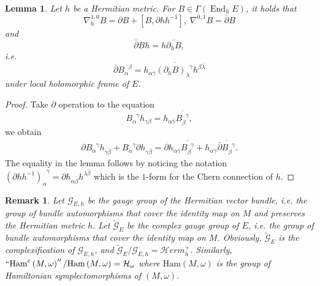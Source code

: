 \documentclass[10pt, letterpaper]{amsart}
\newcommand{\End}{\operatorname{End}}
\theoremstyle{plain}
\newtheorem{lemma}[theorem]{Lemma}
\newtheorem{remark}[theorem]{Remark}
\theoremstyle{definition}
\numberwithin{equation}{section}
\begin{document}
\begin{lemma}
\label{eqn:dB-dbarB}
    Let $h$ be a Hermitian metric. For $B\in \Gamma\left(\End_h E\right)$, it holds that
    \[
    \nabla^{1,0}_hB
    = 
    \partial B+\left[B, \partial hh^{-1}\right], \;
    \nabla^{0,1}B
    =
    \bar\partial B
    \]
    and
    \[
    \bar\partial B h
    = 
    h\overline{\partial_h B}, 
    \]
    i.e. 
    \[
    \bar\partial B_\alpha^{\phantom{\alpha}\beta}
    =     h_{\alpha\bar\gamma}\overline{\left(\partial_h B\right)_\lambda^{\phantom{\lambda}\gamma}}h^{\beta\bar\lambda}
    \]
    under local holomorphic frame of $E$.
\end{lemma}
\begin{proof}
    Take $\partial$ operation to the equation 
    \[  B_\alpha^{\phantom{\alpha}\gamma}h_{\gamma\beta}
    =
    h_{\alpha\bar\gamma}\overline{B_\beta^{\phantom{\beta}\gamma}}, 
    \]
    we obtain 
    \begin{align*}
        \partial B_\alpha^{\phantom{\alpha}\gamma}h_{\gamma\bar\beta}
        + 
        B_\alpha^{\phantom{\alpha}\gamma}\partial h_{\gamma\bar\beta}
        = 
        \partial h_{\alpha\bar\gamma}\overline{B_\beta^{\phantom{\beta}\gamma}}
        + 
        h_{\alpha\bar\gamma}\overline{\bar\partial B_\beta^{\phantom{\beta}\gamma}}.
    \end{align*}
    The equality in the lemma follows by noticing the notation $\left(\partial hh^{-1}\right)_\alpha^{\phantom{\alpha}\gamma}=\partial h_{\alpha\bar\beta}h^{\lambda\bar\beta}$ which is the $1$-form for the Chern connection of $h$.
\end{proof}

\begin{remark}
	Let $\mathcal{G}_{E,h}$ be the gauge group of the Hermitian vector bundle, i.e. the group of bundle automorphisms that cover the identity map on $M$ and preserves the Hermitian metric $h$. Let $\widetilde{\mathcal{G}}_E$ be the complex gauge group of $E$, i.e. the group of bundle automorphisms that cover the identity map on $M$. Obviously, $\widetilde{\mathcal{G}}_E$ is the complexification of $\mathcal{G}_{E,h}$, and $\widetilde{\mathcal{G}}_E/\mathcal{G}_{E,h}=\mathcal{H}erm_h^+$. Similarly,  $``\text{Ham}^c\left(M,\omega\right)''/\text{Ham}\left(M,\omega\right)=\mathcal{H}_\omega$ where $\text{Ham}\left(M,\omega\right)$ is the group of Hamiltonian symplectomorphisms of $(M,\omega)$.
	\end{remark}
\end{document}
